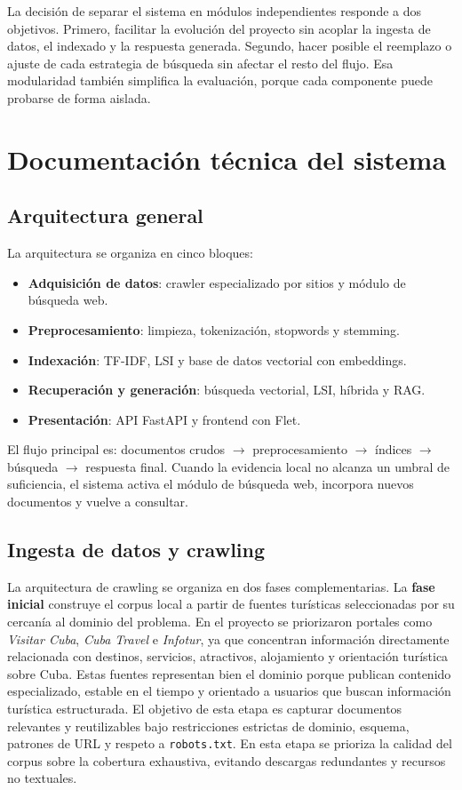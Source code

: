 \documentclass{llncs}
\begin{document}
La decisión de separar el sistema en módulos independientes responde a dos objetivos. Primero, facilitar la evolución del proyecto sin acoplar la ingesta de datos, el indexado y la respuesta generada. Segundo, hacer posible el reemplazo o ajuste de cada estrategia de búsqueda sin afectar el resto del flujo. Esa modularidad también simplifica la evaluación, porque cada componente puede probarse de forma aislada.

\section{Documentación técnica del sistema}

\subsection{Arquitectura general}

La arquitectura se organiza en cinco bloques:

\begin{itemize}
    \item \textbf{Adquisición de datos}: crawler especializado por sitios y módulo de búsqueda web.
    \item \textbf{Preprocesamiento}: limpieza, tokenización, stopwords y stemming.
    \item \textbf{Indexación}: TF-IDF, LSI y base de datos vectorial con embeddings.
    \item \textbf{Recuperación y generación}: búsqueda vectorial, LSI, híbrida y RAG.
    \item \textbf{Presentación}: API FastAPI y frontend con Flet.
\end{itemize}

El flujo principal es: documentos crudos $\rightarrow$ preprocesamiento $\rightarrow$ índices $\rightarrow$ búsqueda $\rightarrow$ respuesta final. Cuando la evidencia local no alcanza un umbral de suficiencia, el sistema activa el módulo de búsqueda web, incorpora nuevos documentos y vuelve a consultar.

\subsection{Ingesta de datos y crawling}

La arquitectura de crawling se organiza en dos fases complementarias. La \textbf{fase inicial} construye el corpus local a partir de fuentes turísticas seleccionadas por su cercanía al dominio del problema. En el proyecto se priorizaron portales como \textit{Visitar Cuba}, \textit{Cuba Travel} e \textit{Infotur}, ya que concentran información directamente relacionada con destinos, servicios, atractivos, alojamiento y orientación turística sobre Cuba. Estas fuentes representan bien el dominio porque publican contenido especializado, estable en el tiempo y orientado a usuarios que buscan información turística estructurada. El objetivo de esta etapa es capturar documentos relevantes y reutilizables bajo restricciones estrictas de dominio, esquema, patrones de URL y respeto a \texttt{robots.txt}. En esta etapa se prioriza la calidad del corpus sobre la cobertura exhaustiva, evitando descargas redundantes y recursos no textuales.
\end{document}
